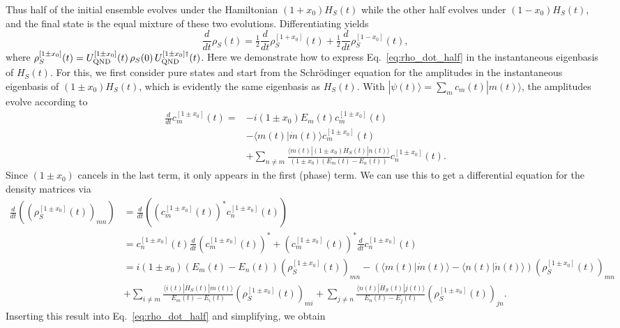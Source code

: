 Thus half of the initial ensemble evolves under the Hamiltonian $(1+x_0)H_S(t)$ while the other half evolves under $(1-x_0)H_S(t)$, and the final state is the equal mixture of these two evolutions. Differentiating yields
\begin{equation}\label{eq:rho_dot_half}
    \frac{d}{dt}\rho_S(t) = \tfrac{1}{2}\frac{d}{dt}\rho^{[1+x_0]}_S(t) + \tfrac{1}{2}\frac{d}{dt}\rho^{[1-x_0]}_S(t),
\end{equation}
where $\rho^{[1\pm x_0]}_S(t)=U^{[1\pm x_0]}_{\rm QND}(t)\,\rho_S(0)\,U^{[1\pm x_0]\dagger}_{\rm QND}(t)$. Here we demonstrate how to express Eq.~\eqref{eq:rho_dot_half} in the instantaneous eigenbasis of $H_S(t)$. For this, we first consider pure states and start from the Schr\"odinger equation for the amplitudes in the instantaneous eigenbasis of $(1 \pm x_0)H_S(t)$, which is evidently the same eigenbasis as $H_S(t)$. With $|\psi(t)\rangle = \sum_m c_m(t) |m(t)\rangle$, the amplitudes evolve according to
\begin{align}
    \frac{d}{dt} c_m^{[1\pm x_0]}(t) =& -i(1 \pm x_0)E_m(t)c_m^{[1\pm x_0]}(t) \nonumber \\
    &- \langle m(t)| \dot{m}(t)\rangle c_m^{[1\pm x_0]}(t) \nonumber \\
    &+ \sum_{n \neq m} \frac{\langle m(t)|(1 \pm x_0) \dot{H}_S(t)|n(t)\rangle}{(1 \pm x_0)(E_m(t) - E_n(t))} c_n^{[1\pm x_0]}(t).
\end{align}
Since $(1 \pm x_0)$ cancels in the last term, it only appears in the first (phase) term. We can use this to get a differential equation for the density matrices via
\begin{align}
    \frac{d}{dt} ((\rho_S^{[1\pm x_0]}(t))_{mn}) &= \frac{d}{dt} ((c_m^{[1\pm x_0]}(t))^* c_n^{[1\pm x_0]}(t)) \nonumber \\
    &= c_n^{[1\pm x_0]}(t) \frac{d}{dt} (c_m^{[1\pm x_0]}(t))^* + (c_m^{[1\pm x_0]}(t))^* \frac{d}{dt} c_n^{[1\pm x_0]}(t) \nonumber \\
    &= i(1 \pm x_0)(E_m(t) - E_n(t))(\rho_S^{[1\pm x_0]}(t))_{mn} - (\langle m(t)| \dot{m}(t)\rangle - \langle n(t)| \dot{n}(t)\rangle)(\rho_S^{[1\pm x_0]}(t))_{mn} \nonumber \\
    &+ \sum_{i \neq m} \frac{\langle i(t)| \dot{H}_S(t)|m(t)\rangle}{E_m(t) - E_i(t)} (\rho_S^{[1\pm x_0]}(t))_{mi} + \sum_{j \neq n} \frac{\langle n(t)| \dot{H}_S(t)|j(t)\rangle}{E_n(t) - E_j(t)} (\rho_S^{[1\pm x_0]}(t))_{jn}.
\end{align}
Inserting this result into Eq.~\eqref{eq:rho_dot_half} and simplifying, we obtain

